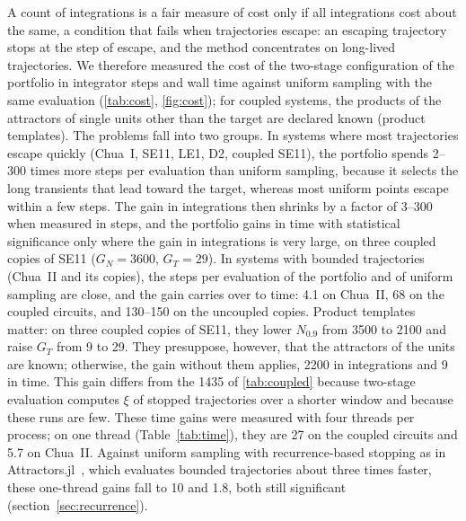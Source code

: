 A count of integrations is a fair measure of cost only if all integrations cost about the same, a condition that fails when trajectories escape: an escaping trajectory stops at the step of escape, and the method concentrates on long-lived trajectories. We therefore measured the cost of the two-stage configuration of the portfolio in integrator steps and wall time against uniform sampling with the same evaluation (\cref{tab:cost}, \cref{fig:cost}); for coupled systems, the products of the attractors of single units other than the target are declared known (product templates). The problems fall into two groups. In systems where most trajectories escape quickly (Chua~I, SE11, LE1, D2, coupled SE11), the portfolio spends 2--300 times more steps per evaluation than uniform sampling, because it selects the long transients that lead toward the target, whereas most uniform points escape within a few steps. The gain in integrations then shrinks by a factor of 3--300 when measured in steps, and the portfolio gains in time with statistical significance only where the gain in integrations is very large, on three coupled copies of SE11 ($G_N=3600$, $G_T=29$). In systems with bounded trajectories (Chua~II and its copies), the steps per evaluation of the portfolio and of uniform sampling are close, and the gain carries over to time: 4.1 on Chua~II, 68 on the coupled circuits, and 130--150 on the uncoupled copies. Product templates matter: on three coupled copies of SE11, they lower $N_{0.9}$ from 3500 to 2100 and raise $G_T$ from 9 to 29. They presuppose, however, that the attractors of the units are known; otherwise, the gain without them applies, 2200 in integrations and 9 in time. This gain differs from the 1435 of \cref{tab:coupled} because two-stage evaluation computes $\xi$ of stopped trajectories over a shorter window and because these runs are few. These time gains were measured with four threads per process; on one thread (Table~\ref{tab:time}), they are 27 on the coupled circuits and 5.7 on Chua~II. Against uniform sampling with recurrence-based stopping as in Attractors.jl~\cite{DatserisWagemakers2022,Datseris2023Framework}, which evaluates bounded trajectories about three times faster, these one-thread gains fall to 10 and 1.8, both still significant (section~\ref{sec:recurrence}).


